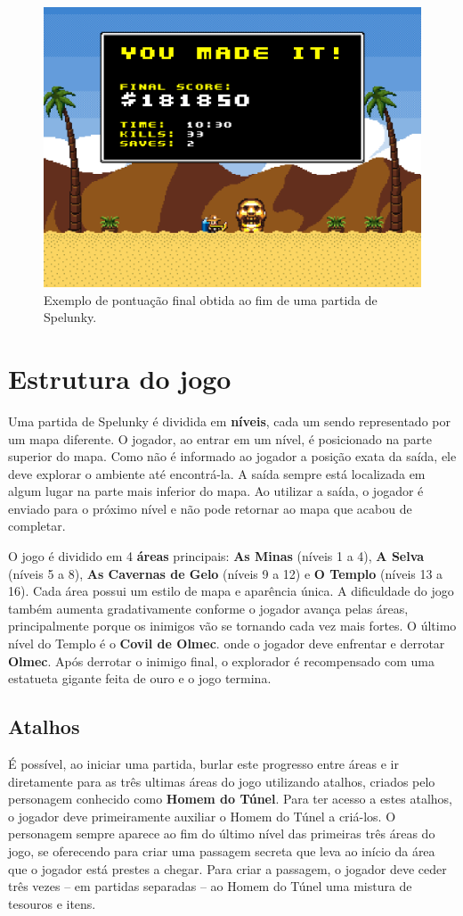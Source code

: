 \begin{figure}[htb!]
\centering
\includegraphics[width=.65\textwidth]{fig/spelunky-score.png}
\caption{\label{fig:spelunky-scores}Exemplo de pontuação final obtida ao fim de
uma partida de Spelunky.}
\end{figure}


\section{\label{section:spelunky-structure}Estrutura do jogo}
Uma partida de Spelunky é dividida em \textbf{níveis}, cada um sendo
representado por um mapa diferente. O jogador, ao entrar em um nível, é
posicionado na parte superior do mapa. Como não é informado ao jogador a posição
exata da saída, ele deve explorar o ambiente até encontrá-la. A saída sempre
está localizada em algum lugar na parte mais inferior do mapa. Ao utilizar a
saída, o jogador é enviado para o próximo nível e não pode retornar ao mapa que
acabou de completar.

O jogo é dividido em 4 \textbf{áreas} principais: \textbf{As Minas} (níveis 1 a
4), \textbf{A Selva} (níveis 5 a 8), \textbf{As Cavernas de Gelo} (níveis 9 a
12) e \textbf{O Templo} (níveis 13 a 16). Cada área possui um estilo de mapa e
aparência única. A dificuldade do jogo também aumenta gradativamente conforme o
jogador avança pelas áreas, principalmente porque os inimigos vão se tornando
cada vez mais fortes. O último nível do Templo é o \textbf{Covil de Olmec}. onde
o jogador deve enfrentar e derrotar \textbf{Olmec}. Após derrotar o inimigo
final, o explorador é recompensado com uma estatueta gigante feita de ouro e o
jogo termina.


\subsection{Atalhos}
É possível, ao iniciar uma partida, burlar este progresso entre áreas e ir
diretamente para as três ultimas áreas do jogo utilizando atalhos, criados pelo
personagem conhecido como \textbf{Homem do Túnel}. Para ter acesso a estes
atalhos, o jogador deve primeiramente auxiliar o Homem do Túnel a criá-los. O
personagem sempre aparece ao fim do último nível das primeiras três áreas do
jogo, se oferecendo para criar uma passagem secreta que leva ao início da área
que o jogador está prestes a chegar. Para criar a passagem, o jogador deve ceder
três vezes -- em partidas separadas -- ao Homem do Túnel uma mistura de tesouros
e itens.

